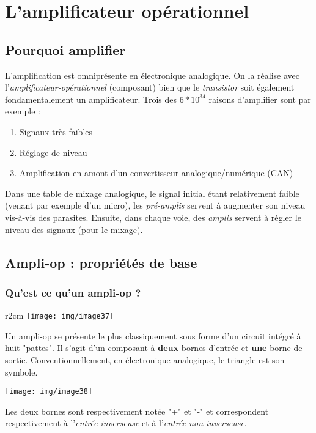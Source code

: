 \chapter{L'amplificateur opérationnel}
\setcounter{section}{-1}
\section{Pourquoi amplifier}
L'amplification est omniprésente en électronique analogique. On la réalise avec l'\textit{amplificateur-opérationnel} (composant) bien que le \textit{transistor} soit également fondamentalement un amplificateur. Trois des $6*10^{34}$ raisons d'amplifier sont par exemple : 
\begin{enumerate}
	\item Signaux très faibles
	\item Réglage de niveau
	\item Amplification en amont d'un convertisseur analogique/numérique (CAN)
\end{enumerate}

Dans une table de mixage analogique, le signal initial étant relativement faible (venant par exemple d'un micro), les \textit{pré-amplis} servent à augmenter son niveau vis-à-vis des parasites. Ensuite, dans chaque voie, des \textit{amplis} servent à régler le niveau des signaux (pour le mixage).



\section{Ampli-op : propriétés de base}
\subsection{Qu'est ce qu'un ampli-op ?}
\begin{wrapfigure}[5]{r}{2cm}
	\texttt{[image: img/image37]}
\end{wrapfigure}

Un ampli-op se présente le plus classiquement sous forme d'un circuit intégré à huit "pattes". Il s'agit d'un composant à \textbf{deux} bornes d'entrée et \textbf{une} borne de sortie. Conventionnellement, en électronique analogique, le triangle est son symbole.
\begin{center}
	\texttt{[image: img/image38]}
\end{center}
Les deux bornes sont respectivement notée "+" et "-" et correspondent respectivement à l'\textit{entrée inverseuse} et à l'\textit{entrée non-inverseuse}.

